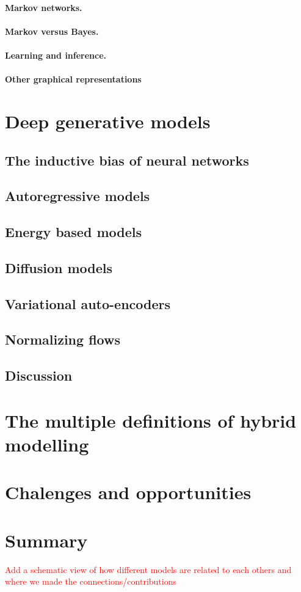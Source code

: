 \paragraph{Markov networks.}

\paragraph{Markov versus Bayes.}

\paragraph{Learning and inference.}

\paragraph{Other graphical representations}

\section{Deep generative models}
\subsection{The inductive bias of neural networks}
\subsection{Autoregressive models}
\subsection{Energy based models}
\subsection{Diffusion models}
\subsection{Variational auto-encoders}
\subsection{Normalizing flows}
\subsection{Discussion}

\section{The multiple definitions of hybrid modelling}

\section{Chalenges and opportunities}

\section{Summary}

\textcolor{red}{Add a schematic view of how different models are related to each others and where we made the connections/contributions}

